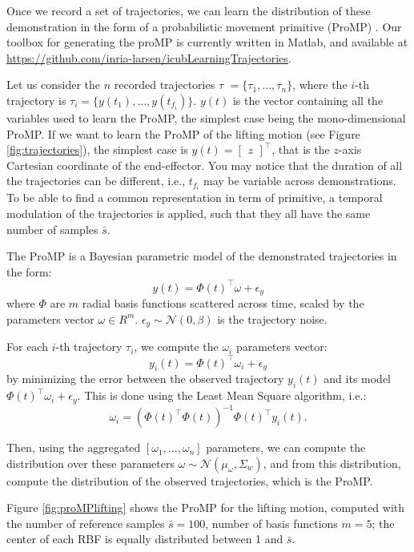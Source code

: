 Once we record a set of trajectories, we can learn the distribution of these demonstration in the form of a probabilistic movement primitive (ProMP) \cite{Paraschos_NIPS_2013a}.
Our toolbox for generating the proMP is currently written in Matlab, and available at \url{https://github.com/inria-larsen/icubLearningTrajectories}.

Let us consider the $n$ recorded trajectories \textcircled{$ \tau$} $= \{\tau_1,..., \tau_n \}$, where  the $i$-th trajectory is $\tau_i = \{y(t_1), ..., y(t_{f_i})\}$. 
$y(t)$ is the vector containing all the variables used to learn the ProMP, the simplest case being the mono-dimensional ProMP. If we want to learn the ProMP of the lifting motion (see Figure \ref{fig:trajectories}), the simplest case is $y(t) =\begin{bmatrix} z\end{bmatrix}^{\top}$, that is the $z$-axis Cartesian coordinate of the end-effector. You may notice that the duration of all the trajectories can be different, i.e.,  $t_{f_i}$ may be variable across demonstrations. 
To be able to find a common representation in term of primitive, a temporal modulation of the trajectories is applied, such that they all have the same number of samples $\bar{s}$. 

The ProMP is a Bayesian parametric model of the demonstrated trajectories in the form: 
$$y(t) = \Phi(t)^\top \omega + \epsilon_y$$ 
where $\Phi$ are $m$ radial basis functions scattered across time, scaled by the parameters vector $\omega \in R^m$. 
$\epsilon_y \sim \mathcal{N}(0, \beta) $ is the trajectory noise. 

For each $i$-th trajectory $\tau_i$, we compute the $\omega_i$ parameters vector:
$$y_i(t) = \Phi(t)^\top \omega_i + \epsilon_y$$ 
by minimizing the error between the observed trajectory $y_i(t)$ and its model $\Phi(t)^\top \omega_i + \epsilon_y$. This is done using the Least Mean Square algorithm, i.e.:
$$ \omega_i = (\Phi(t)^\top\Phi(t))^{-1}\Phi(t)^\top y_i(t).$$

Then, using the aggregated $[\omega_1,..., \omega_n]$ parameters, we can compute the distribution over these parameters $\omega \sim \mathcal{N}(\mu_\omega, \Sigma_w)$, and from this distribution, compute the distribution of the observed trajectories, which is the ProMP.

Figure \ref{fig:proMPlifting} shows the ProMP for the lifting motion, computed with the number of reference samples $\bar{s}=100$, number of basis functions $m=5$; the center of each RBF is equally distributed between 1 and $\bar{s}$.


